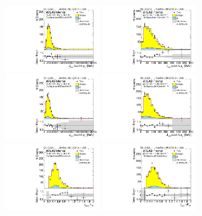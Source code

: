 \begin{figure}[htbp!]
\begin{center}
\includegraphics[width=0.31\textwidth,angle=-90]{figures/boosted/Signal/b77_ThreeTag_Signal_leadHCand_trk0_Pt.pdf}
\includegraphics[width=0.31\textwidth,angle=-90]{figures/boosted/Signal/b77_ThreeTag_Signal_leadHCand_trk1_Pt.pdf}\\
\includegraphics[width=0.31\textwidth,angle=-90]{figures/boosted/Signal/b77_ThreeTag_Signal_sublHCand_trk0_Pt.pdf}
\includegraphics[width=0.31\textwidth,angle=-90]{figures/boosted/Signal/b77_ThreeTag_Signal_sublHCand_trk1_Pt.pdf}\\
\includegraphics[width=0.31\textwidth,angle=-90]{figures/boosted/Signal/b77_ThreeTag_Signal_leadHCand_trk_dr.pdf}
\includegraphics[width=0.31\textwidth,angle=-90]{figures/boosted/Signal/b77_ThreeTag_Signal_sublHCand_trk_dr.pdf}

\end{center}
\end{figure}
